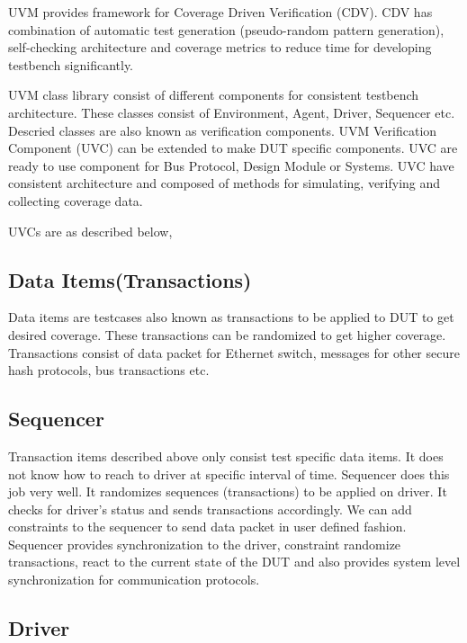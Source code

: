 UVM provides framework for Coverage Driven Verification (CDV). CDV has combination of automatic test generation (pseudo-random pattern generation), self-checking architecture and coverage metrics to reduce time for developing testbench significantly. \par

UVM class library consist of different components for consistent testbench architecture. These classes consist of Environment, Agent, Driver, Sequencer etc. Descried classes are also known as verification components. UVM Verification Component (UVC) can be extended to make DUT specific components. UVC are ready to use component for Bus Protocol, Design Module or Systems. UVC have consistent architecture and composed of methods for simulating, verifying and collecting coverage data. \par

UVCs are as described below,

\subsection{Data Items(Transactions)}

Data items are testcases also known as transactions to be applied to DUT to get desired coverage. These transactions can be randomized to get higher coverage. Transactions consist of data packet for Ethernet switch, messages for other secure hash protocols, bus transactions etc. \par

\subsection{Sequencer}

Transaction items described above only consist test specific data items. It does not know how to reach to driver at specific interval of time. Sequencer does this job very well. It randomizes sequences (transactions) to be applied on driver. It checks for driver’s status and sends transactions accordingly. We can add constraints to the sequencer to send data packet in user defined fashion. Sequencer provides synchronization to the driver, constraint randomize transactions, react to the current state of the DUT and also provides system level synchronization for communication protocols.

\subsection{Driver}

